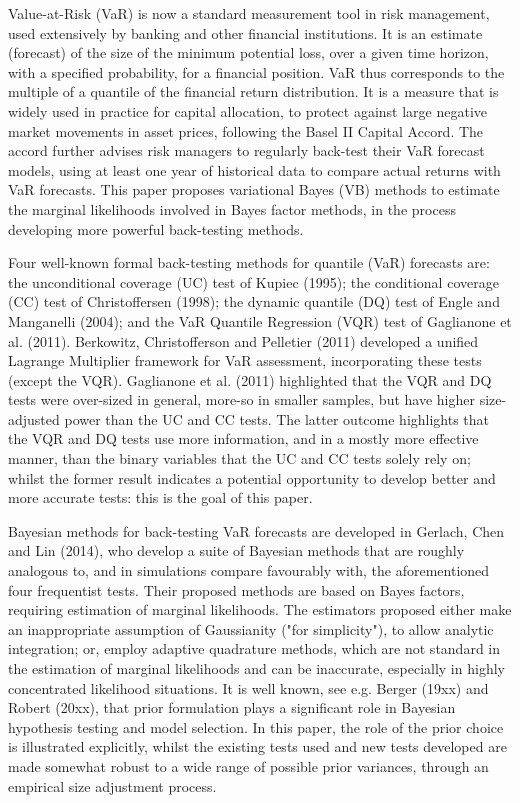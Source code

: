 \documentclass[12pt,epsf]{article}
\begin{document}
Value-at-Risk (VaR) is now a standard measurement tool in risk management, used extensively by banking and other financial institutions.
It is an estimate (forecast) of the size of the minimum potential loss, over a given time horizon, with a specified probability,
for a financial position. VaR thus corresponds to the multiple of a quantile of the financial return distribution. It is a measure
that is widely used in practice for capital allocation, to protect against large negative market movements in asset prices,
following the Basel II Capital Accord. The accord further advises risk managers to regularly back-test their VaR forecast models,
using at least one year of historical data to compare actual returns with VaR forecasts. This paper proposes variational Bayes (VB) methods
to estimate the marginal likelihoods involved in Bayes factor methods, in the process developing more powerful back-testing methods.

Four well-known formal back-testing methods for quantile (VaR) forecasts are: the unconditional coverage (UC) test of Kupiec (1995); the
conditional coverage (CC) test of Christoffersen (1998); the dynamic quantile (DQ) test of Engle and Manganelli (2004); and the VaR Quantile
Regression (VQR) test of Gaglianone et al. (2011). Berkowitz, Christofferson and Pelletier (2011) developed a unified Lagrange
Multiplier framework for VaR assessment, incorporating these tests (except the VQR). Gaglianone et al. (2011) highlighted that the
VQR and DQ tests were over-sized in general, more-so in smaller samples, but have higher size-adjusted power than the UC and CC tests.
The latter outcome highlights that the VQR and DQ tests use more information, and in a mostly more effective manner, than the binary
variables that the UC and CC tests solely rely on; whilst the former result indicates a potential opportunity to develop better
and more accurate tests: this is the goal of this paper.

Bayesian methods for back-testing VaR forecasts are developed in Gerlach, Chen and Lin (2014), who develop a suite of
Bayesian methods that are roughly analogous to, and in simulations compare favourably with, the aforementioned four frequentist tests.
Their proposed methods are based on Bayes factors, requiring estimation of marginal likelihoods. The estimators proposed either
make an inappropriate assumption of Gaussianity ("for simplicity"), to allow analytic integration; or,
employ adaptive quadrature methods, which are not standard in the estimation of marginal likelihoods and can be inaccurate, especially in
highly concentrated likelihood situations. It is well known, see e.g. Berger (19xx) and Robert (20xx), that prior formulation plays a significant
role in Bayesian hypothesis testing and model selection. In this paper, the role of the prior choice is illustrated explicitly, whilst the
existing tests used and new tests developed are made somewhat robust to a wide range of possible prior variances, through an empirical size adjustment process.
\end{document}
